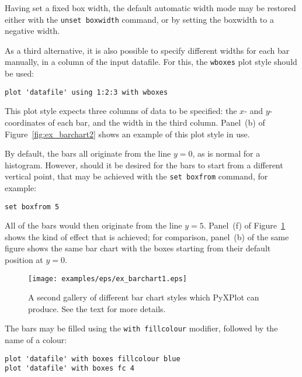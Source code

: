 \documentclass[a4paper,onecolumn,11pt]{book}
\begin{document}
Having set a fixed box width, the default automatic width mode may be restored
either with the \texttt{unset boxwidth} command, or by setting the boxwidth to
a negative width.

As a third alternative, it is also possible to specify different widths for
each bar manually, in a column of the input datafile. For this, the
\texttt{wboxes} plot style
should be used:

\begin{verbatim} 
plot 'datafile' using 1:2:3 with wboxes
\end{verbatim}

\noindent This plot style expects three columns of data to be specified: the
$x$- and $y$-coordinates of each bar, and the width in the third column.
Panel~(b) of Figure~\ref{fig:ex_barchart2} shows an example of this plot style
in use.

By default, the bars all originate from the line $y=0$, as is normal for a
histogram. However, should it be desired for the bars to start from a different
vertical point, that may be achieved with the \texttt{set boxfrom} command, for
example:

\begin{verbatim} 
set boxfrom 5
\end{verbatim}

\noindent All of the bars would then originate from the line $y=5$. Panel~(f)
of Figure~\ref{fig:ex_barchart1} shows the kind of effect that is achieved; for
comparison, panel~(b) of the same figure shows the same bar chart with the
boxes starting from their default position at $y=0$.

\begin{figure}
\begin{center}
\texttt{[image: examples/eps/ex\_barchart1.eps]}
\end{center}
\caption{A second gallery of different bar chart styles which PyXPlot can produce. See the text for more details.}
\label{fig:ex_barchart1}
\end{figure}

The bars may be filled using the \texttt{with fillcolour} modifier, followed by the name of a
colour:

\begin{verbatim} 
plot 'datafile' with boxes fillcolour blue
plot 'datafile' with boxes fc 4
\end{verbatim}
\end{document}

